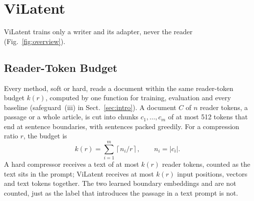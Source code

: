 \section{ViLatent}
\label{sec:method}

ViLatent trains only a writer and its adapter, never the reader (Fig.~\ref{fig:overview}).



\subsection{Reader-Token Budget}
\label{sec:budget}
Every method, soft or hard, reads a document within the same reader-token budget $k(r)$, computed by one function for training, evaluation and every baseline (safeguard~(iii) in Sect.~\ref{sec:intro}).
A document $C$ of $n$ reader tokens, a passage or a whole article, is cut into chunks $c_1,\dots,c_m$ of at most 512 tokens that end at sentence boundaries, with sentences packed greedily.
For a compression ratio $r$, the budget is
\begin{equation}
k(r) = \sum_{i=1}^{m} \left\lceil n_i / r \right\rceil, \qquad n_i = |c_i| .
\label{eq:budget}
\end{equation}
A hard compressor receives a text of at most $k(r)$ reader tokens, counted as the text sits in the prompt; ViLatent receives at most $k(r)$ input positions, vectors and text tokens together.
The two learned boundary embeddings \mem{} and \cmem{} are not counted, just as the label that introduces the passage in a text prompt is not.

